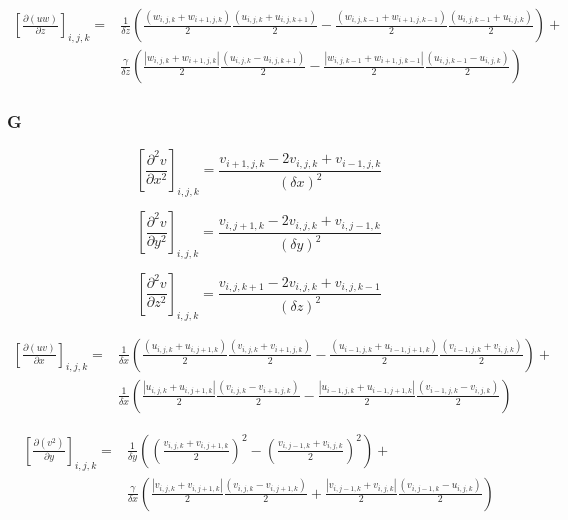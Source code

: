 \documentclass[10pt]{article}
\begin{document}
\begin{equation}
\begin{split}
\left[\frac{\partial(uw)}{\partial z}\right]_{i,j,k} = &
\frac{1}{\delta z}
\left(
	\frac{(w_{i,j,k}+w_{i+1,j,k})}{2} \frac{(u_{i,j,k}+u_{i,j,k+1})}{2} -
	\frac{(w_{i,j,k-1}+w_{i+1,j,k-1})}{2} \frac{(u_{i,j,k-1}+u_{i,j,k})}{2}
\right) + \\
& \frac{\gamma}{\delta z}
\left(
	\frac{|w_{i,j,k}+w_{i+1,j,k}|}{2} \frac{(u_{i,j,k}-u_{i,j,k+1})}{2} -
	\frac{|w_{i,j,k-1}+w_{i+1,j,k-1}|}{2} \frac{(u_{i,j,k-1}-u_{i,j,k})}{2}
\right)
\end{split}
\end{equation}

\subsubsection{G}
\begin{equation}
\left[\frac{\partial^2 v}{\partial x^2}\right]_{i,j,k} =
\frac{v_{i+1,j,k} - 2v_{i,j,k} + v_{i-1,j,k}}{(\delta x)^2}
\end{equation}

\begin{equation}
\left[\frac{\partial^2 v}{\partial y^2}\right]_{i,j,k} =
\frac{v_{i,j+1,k} - 2v_{i,j,k} + v_{i,j-1,k}}{(\delta y)^2}
\end{equation}

\begin{equation}
\left[\frac{\partial^2 v}{\partial z^2}\right]_{i,j,k} =
\frac{v_{i,j,k+1} - 2v_{i,j,k} + v_{i,j,k-1}}{(\delta z)^2}
\end{equation}

\begin{equation}
\begin{split}
\left[\frac{\partial(uv)}{\partial x}\right]_{i,j,k} = &
\frac{1}{\delta x}
\left(
	\frac{(u_{i,j,k}+u_{i,j+1,k})}{2} \frac{(v_{i,j,k}+v_{i+1,j,k})}{2} -
	\frac{(u_{i-1,j,k}+u_{i-1,j+1,k})}{2} \frac{(v_{i-1,j,k}+v_{i,j,k})}{2}
\right) + \\
& \frac{1}{\delta x}
\left(
	\frac{|u_{i,j,k}+u_{i,j+1,k}|}{2} \frac{(v_{i,j,k}-v_{i+1,j,k})}{2} -
	\frac{|u_{i-1,j,k}+u_{i-1,j+1,k}|}{2} \frac{(v_{i-1,j,k}-v_{i,j,k})}{2}
\right)
\end{split}
\end{equation}

\begin{equation}
\begin{split}
\left[\frac{\partial(v^2)}{\partial y}\right]_{i,j,k} = &
\frac{1}{\delta y}
\left(
	\left(\frac{v_{i,j,k}+v_{i,j+1,k}}{2}\right)^2 -
	\left(\frac{v_{i,j-1,k}+v_{i,j,k}}{2}\right)^2
\right) + \\
& \frac{\gamma}{\delta x}
\left(
	\frac{|v_{i,j,k}+v_{i,j+1,k}|}{2} \frac{(v_{i,j,k}-v_{i,j+1,k})}{2} +
	\frac{|v_{i,j-1,k}+v_{i,j,k}|}{2} \frac{(v_{i,j-1,k}-u_{i,j,k})}{2}
\right)
\end{split}
\end{equation}
\end{document}
